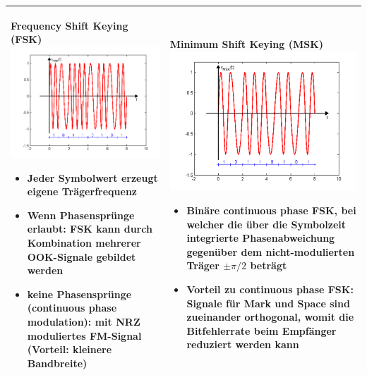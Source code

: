 \begin{longtable}{|p{9cm}|p{9cm}|}
	\textbf{Frequency Shift Keying (FSK)}\newline
	\includegraphics[width=8cm]{bilder/DigitaleTraegermodulation/FSK.png}
	\begin{itemize}[noitemsep]
		\item Jeder Symbolwert erzeugt eigene Trägerfrequenz
		\item Wenn Phasensprünge erlaubt: FSK kann durch Kombination mehrerer OOK-Signale gebildet werden
		\item keine Phasensprünge (continuous phase modulation): mit NRZ moduliertes FM-Signal (Vorteil: kleinere Bandbreite)
	\end{itemize}
	&
	\textbf{Minimum Shift Keying (MSK)}\newline
	\includegraphics[width=8cm]{bilder/DigitaleTraegermodulation/MSK.png}
	\begin{itemize}[noitemsep]
		\item Binäre continuous phase FSK, bei welcher die über die Symbolzeit integrierte Phasenabweichung gegenüber dem nicht-modulierten Träger $\pm \pi/2$ beträgt
		\item Vorteil zu continuous phase FSK: Signale für Mark und Space sind zueinander orthogonal, womit die Bitfehlerrate beim Empfänger reduziert werden kann
	\end{itemize}\\
	
	\hline
\end{longtable}


